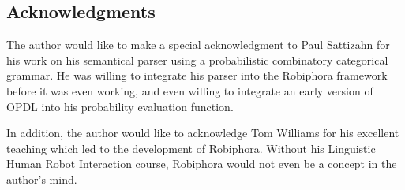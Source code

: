 \documentclass[12pt]{article}
\begin{document}
\label{sec:conclusion}

\subsection{Acknowledgments}

The author would like to make a special acknowledgment to Paul Sattizahn for
his work on his semantical parser using a probabilistic combinatory categorical
grammar. He was willing to integrate his parser into the Robiphora framework
before it was even working, and even willing to integrate an early version of
OPDL into his probability evaluation function.

In addition, the author would like to acknowledge Tom Williams for his
excellent teaching which led to the development of Robiphora. Without his
Linguistic Human Robot Interaction course, Robiphora would not even be a
concept in the author's mind.

\clearpage
\printbibliography
\end{document}
